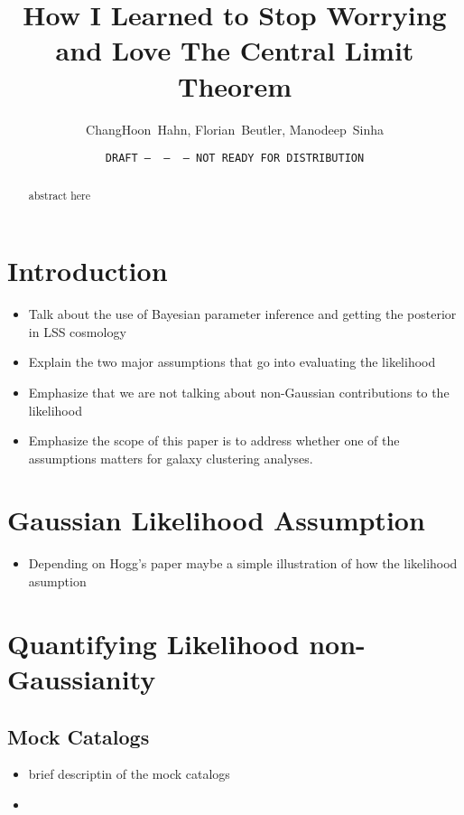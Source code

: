 \documentclass[12pt, letterpaper, preprint]{aastex}
\newcommand{\bitem}{\begin{itemize}}
\newcommand{\eitem}{\end{itemize}}
\begin{document}
\sloppy\sloppypar\frenchspacing 

\title{How I Learned to Stop Worrying and Love The Central Limit Theorem}
\date{\texttt{DRAFT~---~\githash~---~\gitdate~---~NOT READY FOR DISTRIBUTION}}
\author{ChangHoon~Hahn, Florian~Beutler, Manodeep~Sinha}

\begin{abstract}
    abstract here 
\end{abstract}


\section{Introduction}
\begin{itemize}
    \item Talk about the use of Bayesian parameter inference and getting the posterior in LSS cosmology 
    \item Explain the two major assumptions that go into evaluating the likelihood
    \item Emphasize that we are not talking about non-Gaussian contributions to the likelihood
    \item Emphasize the scope of this paper is to address whether one of the assumptions matters for 
        galaxy clustering analyses. 
\end{itemize}

\section{Gaussian Likelihood Assumption}
\begin{itemize}
    \item Depending on Hogg's paper maybe a simple illustration of how the likelihood asumption 
\end{itemize}

\section{Quantifying Likelihood non-Gaussianity}
\subsection{Mock Catalogs}
\bitem
    \item brief descriptin of the mock catalogs 
    \item \cite{kitaura2016, sinha2017}
\eitem
\end{document}
